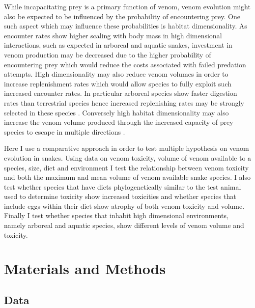 While incapacitating prey is a primary function of venom, venom evolution might also be expected to be influenced by the probability of encountering prey. One such aspect which may influence these probabilities is habitat dimensionality. As encounter rates show higher scaling with body mass in high dimensional interactions, such as expected in arboreal and aquatic snakes, investment in venom production may be decreased due to the higher probability of encountering prey which would reduce the costs associated with failed predation attempts. High dimensionality may also reduce venom volumes in order to increase replenishment rates which would allow species to fully exploit such increased encounter rates. In particular arboreal species show faster digestion rates than terrestrial species hence increased replenishing rates may be strongly selected in these species \citep{lillywhite2002patterns}. Conversely high habitat dimensionality may also increase the venom volume produced through the increased capacity of prey species to escape in multiple directions \citep{healy2014ecology,moller2010up}.

Here I use a comparative approach in order to test multiple hypothesis on venom evolution in snakes. Using data on venom toxicity, volume of venom available to a species, size, diet and environment I test the relationship between venom toxicity and both the maximum and mean volume of venom available snake species. I also test whether species that have diets phylogenetically similar to the test animal used to determine toxicity show increased toxicities and whether species that include eggs within their diet show atrophy of both venom toxicity and volume. Finally I test whether species that inhabit high dimensional environments, namely arboreal and aquatic species, show different levels of venom volume and toxicity.

\section{Materials and Methods}
\subsection{Data}

